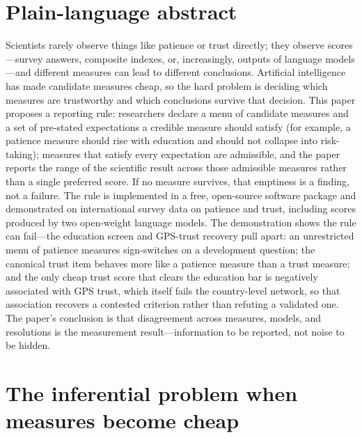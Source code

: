 \documentclass[10pt,letterpaper]{article}
\begin{document}
\section*{Plain-language abstract}
Scientists rarely observe things like patience or trust directly; they observe scores---survey answers, composite indexes, or, increasingly, outputs of language models---and different measures can lead to different conclusions.
Artificial intelligence has made candidate measures cheap, so the hard problem is deciding which measures are trustworthy and which conclusions survive that decision.
This paper proposes a reporting rule: researchers declare a menu of candidate measures and a set of pre-stated expectations a credible measure should satisfy (for example, a patience measure should rise with education and should not collapse into risk-taking); measures that satisfy every expectation are admissible, and the paper reports the range of the scientific result across those admissible measures rather than a single preferred score.
If no measure survives, that emptiness is a finding, not a failure.
The rule is implemented in a free, open-source software package and demonstrated on international survey data on patience and trust, including scores produced by two open-weight language models.
The demonstration shows the rule can fail---the education screen and GPS-trust recovery pull apart: an unrestricted menu of patience measures sign-switches on a development question; the canonical trust item behaves more like a patience measure than a trust measure; and the only cheap trust score that clears the education bar is negatively associated with GPS trust, which itself fails the country-level network, so that association recovers a contested criterion rather than refuting a validated one.
The paper's conclusion is that disagreement across measures, models, and resolutions is the measurement result---information to be reported, not noise to be hidden.

\section{The inferential problem when measures become cheap}
\label{sec:problem}
\end{document}
